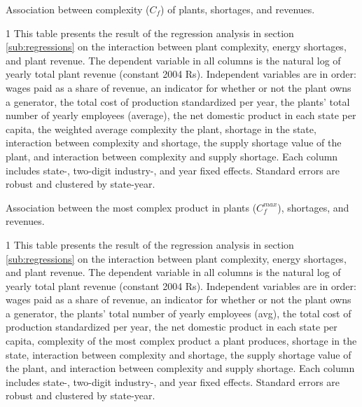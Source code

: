 \documentclass[11pt]{article}
\begin{document}
\begin{sidewaystable}
	\begin{center}
		\begin{threeparttable}
		\caption{Association between complexity ($C_{f}$) of plants, shortages, and revenues.}
			\label{tab:interaction_avg_pci}
			
			\begin{tablenotes} \footnotesize
			\item[1] This table presents the result of the regression analysis in section \ref{sub:regressions} on the interaction between plant complexity, energy shortages, and plant revenue. The dependent variable in all columns is the natural log of yearly total plant revenue (constant 2004 Rs). Independent variables are in order: wages paid as a share of revenue, an indicator for whether or not the plant owns a generator, the total cost of production standardized per year, the plants' total number of yearly employees (average), the net domestic product in each state per capita, the weighted average complexity the plant, shortage in the state, interaction between complexity and shortage, the supply shortage value of the plant, and interaction between complexity and supply shortage. Each column includes state-, two-digit industry-, and year fixed effects. Standard errors are robust and clustered by state-year.
			\end{tablenotes}
		\end{threeparttable}
	\end{center}
\end{sidewaystable}


\begin{sidewaystable}
	\begin{center}
		\begin{threeparttable}
		\caption{Association between the most complex product in plants ($C^{max}_{f}$), shortages, and revenues.}
			\label{tab:interaction_max_pci}
			
			\begin{tablenotes} \footnotesize
			\item[1] This table presents the result of the regression analysis in section \ref{sub:regressions} on the interaction between plant complexity, energy shortages, and plant revenue. The dependent variable in all columns is the natural log of yearly total plant revenue (constant 2004 Rs). Independent variables are in order: wages paid as a share of revenue, an indicator for whether or not the plant owns a generator, the plants' total number of yearly employees (avg), the total cost of production standardized per year, the net domestic product in each state per capita, complexity of the most complex product a plant produces, shortage in the state, interaction between complexity and shortage, the supply shortage value of the plant, and interaction between complexity and supply shortage. Each column includes state-, two-digit industry-, and year fixed effects. Standard errors are robust and clustered by state-year.
			\end{tablenotes}
		\end{threeparttable}
	\end{center}
\end{sidewaystable}
\end{document}
